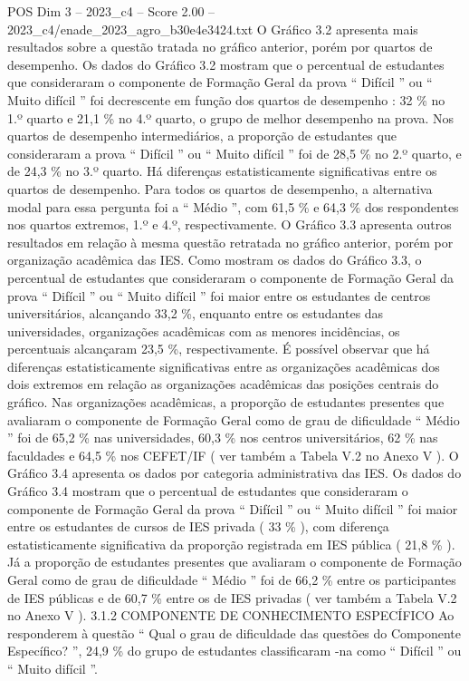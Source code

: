 \begin{textsample}{POS Dim 3 – 2023\_c4 – Score 2.00 – 2023\_c4/enade\_2023\_agro\_b30e4e3424.txt}
O Gráfico 3.2 apresenta mais resultados sobre a questão tratada no gráfico anterior, porém por quartos de desempenho.
Os dados do Gráfico 3.2 mostram que o percentual de estudantes que consideraram o componente de Formação Geral da prova “ Difícil ” ou “ Muito difícil ” foi decrescente em função dos quartos de desempenho : 32 \% no 1.º quarto e 21,1 \% no 4.º quarto, o grupo de melhor desempenho na prova.
Nos quartos de desempenho intermediários, a proporção de estudantes que consideraram a prova “ Difícil ” ou “ Muito difícil ” foi de 28,5 \% no 2.º quarto, e de 24,3 \% no 3.º quarto.
Há diferenças estatisticamente significativas entre os quartos de desempenho.
Para todos os quartos de desempenho, a alternativa modal para essa pergunta foi a “ Médio ”, com 61,5 \% e 64,3 \% dos respondentes nos quartos extremos, 1.º e 4.º, respectivamente.
O Gráfico 3.3 apresenta outros resultados em relação à mesma questão retratada no gráfico anterior, porém por organização acadêmica das IES.
Como mostram os dados do Gráfico 3.3, o percentual de estudantes que consideraram o componente de Formação Geral da prova “ Difícil ” ou “ Muito difícil ” foi maior entre os estudantes de centros universitários, alcançando 33,2 \%, enquanto entre os estudantes das universidades, organizações acadêmicas com as menores incidências, os percentuais alcançaram 23,5 \%, respectivamente.
É possível observar que há diferenças estatisticamente significativas entre as organizações acadêmicas dos dois extremos em relação as organizações acadêmicas das posições centrais do gráfico.
Nas organizações acadêmicas, a proporção de estudantes presentes que avaliaram o componente de Formação Geral como de grau de dificuldade “ Médio ” foi de 65,2 \% nas universidades, 60,3 \% nos centros universitários, 62 \% nas faculdades e 64,5 \% nos CEFET/IF ( ver também a Tabela V.2 no Anexo V ).
O Gráfico 3.4 apresenta os dados por categoria administrativa das IES.
Os dados do Gráfico 3.4 mostram que o percentual de estudantes que consideraram o componente de Formação Geral da prova “ Difícil ” ou “ Muito difícil ” foi maior entre os estudantes de cursos de IES privada ( 33 \% ), com diferença estatisticamente significativa da proporção registrada em IES pública ( 21,8 \% ).
Já a proporção de estudantes presentes que avaliaram o componente de Formação Geral como de grau de dificuldade “ Médio ” foi de 66,2 \% entre os participantes de IES públicas e de 60,7 \% entre os de IES privadas ( ver também a Tabela V.2 no Anexo V ). 3.1.2 COMPONENTE DE CONHECIMENTO ESPECÍFICO Ao responderem à questão “ Qual o grau de dificuldade das questões do Componente Específico? ”, 24,9 \% do grupo de estudantes classificaram -na como “ Difícil ” ou “ Muito difícil ”.

\end{textsample}
